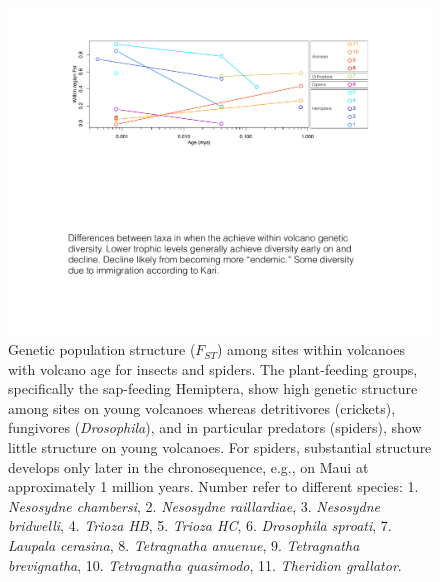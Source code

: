 \documentclass[12pt]{article}
\begin{document}
\begin{linenumbers}
\begin{figure}[!hp]
  \centering
  \includegraphics[scale=0.7]{fig_volcanoFst.pdf}
  \caption{Genetic population structure ($F_{ST}$) among sites within
    volcanoes with volcano age for insects and spiders. The
    plant-feeding groups, specifically the sap-feeding Hemiptera, show
    high genetic structure among sites on young volcanoes whereas
    detritivores (crickets), fungivores ({\it Drosophila}), and in
    particular predators (spiders), show little structure on young
    volcanoes. For spiders, substantial structure develops only later
    in the chronosequence, e.g., on Maui at approximately 1 million
    years. Number refer to different species: 1. {\it Nesosydne
      chambersi}, 2. {\it Nesosydne raillardiae}, 3. {\it Nesosydne
      bridwelli}, 4. {\it Trioza HB}, 5. {\it Trioza HC}, 6. {\it
      Drosophila sproati}, 7. {\it Laupala cerasina}, 8. {\it
      Tetragnatha anuenue}, 9. {\it Tetragnatha brevignatha}, 10. {\it
      Tetragnatha quasimodo}, 11. {\it Theridion grallator}.}
  \label{fig:volcanoFst}
\end{figure}


\end{linenumbers}
\end{document}
